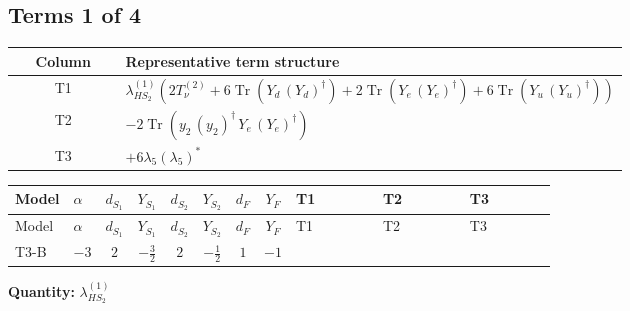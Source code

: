 \documentclass[8pt]{article}
\begin{document}
\begin{landscape}
\subsection*{Terms 1 of 4}
\begin{center}
\begin{tabular}{@{}c >{\raggedright\arraybackslash}p{0.82\linewidth}@{}}
\toprule
Column & Representative term structure \\
\midrule
T1 & \(\displaystyle {\lambda_{HS_2}^{(1)}} (2 T_{\nu}^{(2)}+6 \operatorname{Tr}\!\left({Y_d}\,\left({Y_d}\right)^{\dagger}\right)+2 \operatorname{Tr}\!\left({Y_e}\,\left({Y_e}\right)^{\dagger}\right)+6 \operatorname{Tr}\!\left({Y_u}\,\left({Y_u}\right)^{\dagger}\right))\) \\
\midrule
T2 & \(\displaystyle -2 \operatorname{Tr}\!\left({y_2}\,\left({y_2}\right)^{\dagger}\,{Y_e}\,\left({Y_e}\right)^{\dagger}\right)\) \\
\midrule
T3 & \(\displaystyle +6 {\lambda_5} \left({\lambda_5}\right)^{*}\) \\
\midrule
\bottomrule
\end{tabular}
\end{center}
\smallskip
\tiny
\begin{longtable}{@{}llcccccc >{\raggedright\arraybackslash}p{0.21\linewidth} >{\raggedright\arraybackslash}p{0.21\linewidth} >{\raggedright\arraybackslash}p{0.21\linewidth}@{}}
\toprule
Model & $\alpha$ & $d_{S_1}$ & $Y_{S_1}$ & $d_{S_2}$ & $Y_{S_2}$ & $d_F$ & $Y_F$ & T1 & T2 & T3 \\
\midrule
\endfirsthead
\toprule
Model & $\alpha$ & $d_{S_1}$ & $Y_{S_1}$ & $d_{S_2}$ & $Y_{S_2}$ & $d_F$ & $Y_F$ & T1 & T2 & T3 \\
\midrule
\endhead
T3-B & $-3$ & $2$ & $-\frac{3}{2}$ & $2$ & $-\frac{1}{2}$ & $1$ & $-1$ & \scriptsize\adjustbox{max width=\linewidth}{$\begin{gathered} {\lambda_{HS_2}^{(1)}} (2 T_{\nu}^{(2)}+6 \operatorname{Tr}\!\left({Y_d}\,\left({Y_d}\right)^{\dagger}\right)+2 \operatorname{Tr}\!\left({Y_e}\,\left({Y_e}\right)^{\dagger}\right)+6 \operatorname{Tr}\!\left({Y_u}\,\left({Y_u}\right)^{\dagger}\right))\end{gathered}$} & \scriptsize\adjustbox{max width=\linewidth}{$\begin{gathered} -2 \operatorname{Tr}\!\left({y_2}\,\left({y_2}\right)^{\dagger}\,{Y_e}\,\left({Y_e}\right)^{\dagger}\right)\end{gathered}$} & \scriptsize\adjustbox{max width=\linewidth}{$\begin{gathered} +6 {\lambda_5} \left({\lambda_5}\right)^{*}\end{gathered}$} \\
\midrule
\bottomrule
\end{longtable}
\clearpage
\noindent\textbf{Quantity: }$\lambda_{HS_2}^{(1)}$\par\smallskip

\end{landscape}
\end{document}
